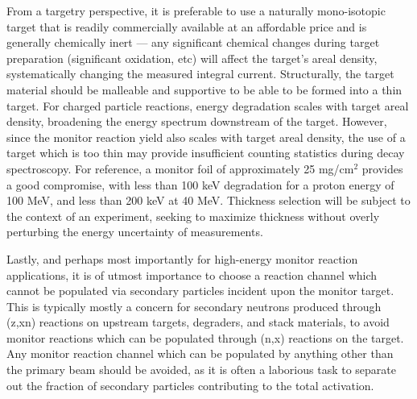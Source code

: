 From a targetry  perspective, it is preferable to use a naturally mono-isotopic target that is readily commercially available at an affordable price and is generally chemically inert --- any significant chemical changes during target preparation (significant oxidation, etc) will affect the target's areal density, systematically changing the measured integral current. 
Structurally, the target material should be malleable and supportive to be able to be formed into a thin target.
For charged particle reactions,  energy degradation scales with target areal density,  broadening the energy spectrum downstream of the target.
However, since the monitor reaction yield also scales with target areal density, the use of a target which is too thin may provide insufficient counting statistics during decay spectroscopy.
For reference, a monitor foil of approximately 25 mg/cm$^2$ provides a good compromise, with less than 100 keV degradation for a proton energy of 100 MeV, and less than 200 keV at 40 MeV.
Thickness selection will be subject to the context of an experiment, seeking to maximize thickness without overly perturbing the energy uncertainty of  measurements.



Lastly, and perhaps most importantly for high-energy monitor reaction applications, it is  of utmost importance to choose a reaction channel which cannot be populated via secondary particles incident upon the monitor target.
This is typically mostly a concern for secondary neutrons produced through (z,xn) reactions on upstream targets, degraders, and stack materials, to avoid monitor reactions which can be populated through (n,x) reactions on the target.
Any monitor reaction channel which can be populated by anything other than the primary beam should be avoided, as it is often a laborious task to separate out the fraction of secondary particles contributing to the total activation.  







